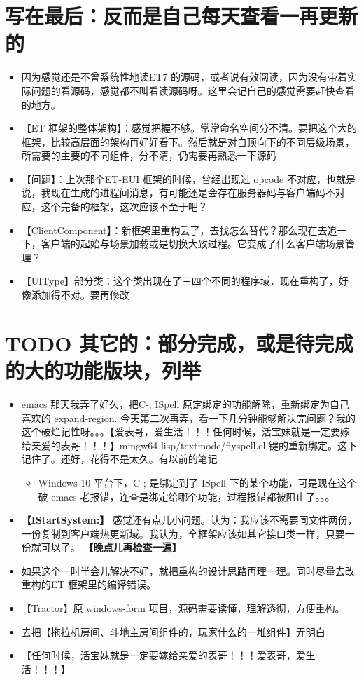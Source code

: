 \documentclass[9pt, b5paper]{article}
\begin{document}
\section{写在最后：反而是自己每天查看一再更新的}
\label{sec-11}
\begin{itemize}
\item 因为感觉还是不曾系统性地读ET7 的源码，或者说有效阅读，因为没有带着实际问题的看源码，感觉都不叫看读源码呀。这里会记自己的感觉需要赶快查看的地方。
\item 【ET 框架的整体架构】：感觉把握不够。常常命名空间分不清。要把这个大的框架，比较高层面的架构再好好看下。然后就是对自顶向下的不同层级场景，所需要的主要的不同组件，分不清，仍需要再熟悉一下源码
\item 【问题】：上次那个ET-EUI 框架的时候，曾经出现过 opcode 不对应，也就是说，我现在生成的进程间消息，有可能还是会存在服务器码与客户端码不对应，这个完备的框架，这次应该不至于吧？
\item 【ClientComponent】：新框架里重构丢了，去找怎么替代？那么现在去追一下，客户端的起始与场景加载或是切换大致过程。它变成了什么客户端场景管理？
\item 【UIType】部分类：这个类出现在了三四个不同的程序域，现在重构了，好像添加得不对。要再修改
\end{itemize}

\section{{\bfseries\sffamily TODO} 其它的：部分完成，或是待完成的大的功能版块，列举}
\label{sec-12}
\begin{itemize}
\item emacs 那天我弄了好久，把C-; ISpell 原定绑定的功能解除，重新绑定为自己喜欢的 expand-region. 今天第二次再弄，看一下几分钟能够解决完问题？我的这个破烂记性呀。。。【爱表哥，爱生活！！！任何时候，活宝妹就是一定要嫁给亲爱的表哥！！！】mingw64 lisp/textmode/flyspell.el 键的重新绑定。这下记住了。还好，花得不是太久。有以前的笔记 
\begin{itemize}
\item Windows 10 平台下，C-; 是绑定到了 ISpell 下的某个功能，可是现在这个破 emacs 老报错，连查是绑定给哪个功能，过程报错都被阻止了。。。
\end{itemize}
\item \textbf{【IStartSystem:】} 感觉还有点儿小问题。认为：我应该不需要同文件两份，一份复制到客户端热更新域。我认为，全框架应该如其它接口类一样，只要一份就可以了。 \textbf{【晚点儿再检查一遍】}
\item 如果这个一时半会儿解决不好，就把重构的设计思路再理一理。同时尽量去改重构的ET 框架里的编译错误。
\item 【Tractor】原 windows-form 项目，源码需要读懂，理解透彻，方便重构。
\item 去把【拖拉机房间、斗地主房间组件的，玩家什么的一堆组件】弄明白
\item 【任何时候，活宝妹就是一定要嫁给亲爱的表哥！！！爱表哥，爱生活！！！】
\end{itemize}
\end{document}
